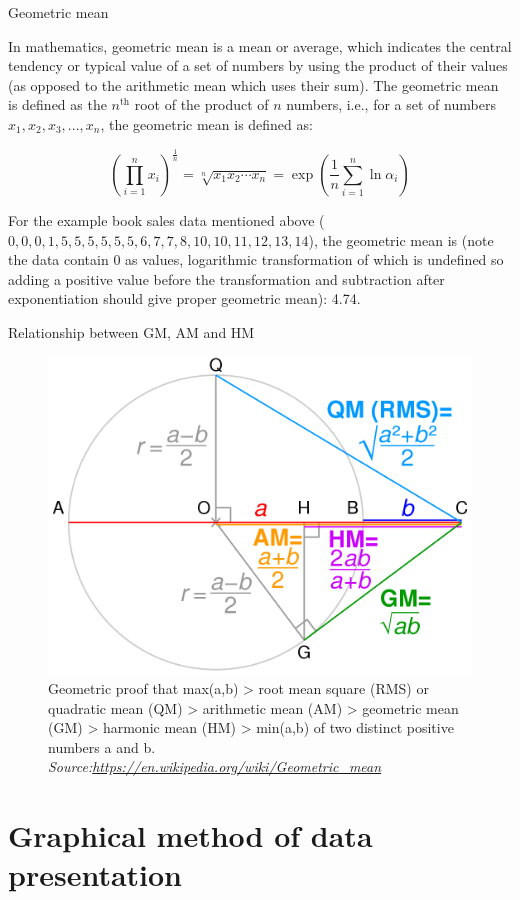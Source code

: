 \documentclass[
  ignorenonframetext,
  aspectratio=169]{beamer}
\begin{document}
\begin{frame}{Geometric mean}
\protect\hypertarget{geometric-mean}{}
\small

In mathematics, geometric mean is a mean or average, which indicates the
central tendency or typical value of a set of numbers by using the
product of their values (as opposed to the arithmetic mean which uses
their sum). The geometric mean is defined as the \(n^{\text{th}}\) root
of the product of \(n\) numbers, i.e., for a set of numbers
\(x_1, x_2, x_3, ..., x_n\), the geometric mean is defined as:

\[
\left(\prod _{i=1}^{n}x_{i}\right)^{\frac {1}{n}}={\sqrt[{n}]{x_{1}x_{2}\cdots x_{n}}} = \exp\left(\frac{1}{n} \sum_{i = 1}^n \ln \alpha_i \right)
\]

For the example book sales data mentioned above (
\(0, 0, 0, 1, 5, 5, 5, 5, 5, 5, 6 , 7, 7, 8, 10, 10, 11, 12, 13, 14\)),
the geometric mean is (note the data contain 0 as values, logarithmic
transformation of which is undefined so adding a positive value before
the transformation and subtraction after exponentiation should give
proper geometric mean): 4.74.
\end{frame}

\begin{frame}{Relationship between GM, AM and HM}
\protect\hypertarget{relationship-between-gm-am-and-hm}{}
\begin{figure}
\includegraphics[width=0.45\linewidth]{./images/geometric_proof_hm_am_gm} \caption{Geometric proof that max(a,b) > root mean square (RMS) or quadratic mean (QM) > arithmetic mean (AM) > geometric mean (GM) > harmonic mean (HM) > min(a,b) of two distinct positive numbers a and b. \textit{Source:\url{https://en.wikipedia.org/wiki/Geometric_mean}}}\label{fig:inequality-relation-gm-am-hm}
\end{figure}
\end{frame}

\hypertarget{graphical-method-of-data-presentation}{%
\section{Graphical method of data
presentation}\label{graphical-method-of-data-presentation}}
\end{document}
